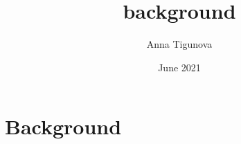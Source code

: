 \documentclass[11pt, oneside]{book}
\title{background}
\author{Anna Tigunova}
\date{June 2021}
\begin{document}
\chapter{Background}






\end{document}
